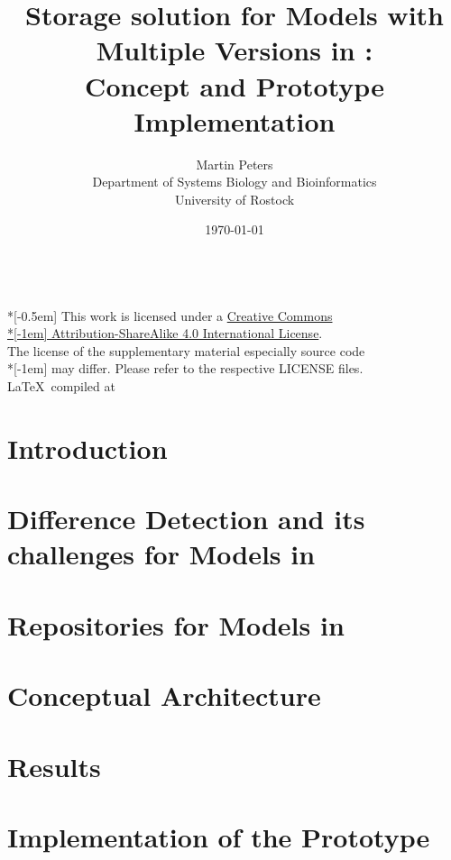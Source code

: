 \documentclass[12pt, a4paper, titlepage]{book}
\title{Storage solution for Models with Multiple Versions in \sysbio:\\ Concept and Prototype Implementation}
\author{Martin Peters\\[24pt]
	\small Department of Systems Biology and Bioinformatics\\[-6pt]
	\small University of Rostock}
\date{\today}
\begin{document}
	\maketitle
	\pagebreak
	~ \vfill
	{
		\tiny \noindent
		{\normalsize \href{http://creativecommons.org/licenses/by-sa/4.0/}{\ccbysa}} \\*[-0.5em]
		This work is licensed under a \href{http://creativecommons.org/licenses/by-sa/4.0/}{Creative Commons\\*[-1em] Attribution-ShareAlike 4.0 International License}. \\
		The license of the supplementary material especially source code\\*[-1em]
		may differ. Please refer to the respective LICENSE files.\\
		\LaTeX ~compiled at \DTMnow
	}
	\pagebreak
	\tableofcontents
	\listoffigures
	
	
	\chapter{Introduction}
	
	
	\chapter{Difference Detection and its challenges for Models in \sysbio}
	
	
	\chapter{Repositories for Models in \sysbio}
	
	
	\chapter{Conceptual Architecture}
	
	
	\chapter{Results}
	
	
	\chapter{Implementation of the Prototype}
	
	
\end{document}
